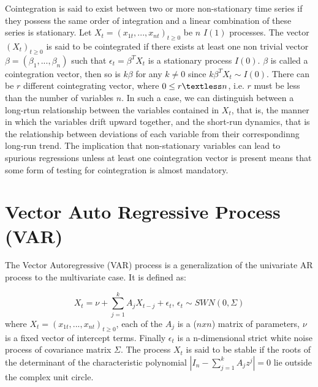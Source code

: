 \documentclass[11pt,a4,twosided,singlespacing,titlepagenumber=on]{scrreprt}
\numberwithin{equation}{chapter} %
\theoremstyle{remark}
\begin{document}
Cointegration is said to exist between two or more non-stationary time series if they possess the same order of integration and a linear combination of these series is stationary. Let $X_t = (x_{1t},...,x_{nt})_{t \geq 0}$ be $n$ $I(1)$ processes. The vector $(X_t)_{t \geq 0}$ is said to be cointegrated if there exists at least one non trivial vector $\beta = (\beta_1,...,\beta_n)$ such that $\epsilon_t = \beta^T X_t$ is a stationary process $I(0)$. $\beta$ is called a cointegration vector, then so is $k \beta$ for any $k \neq 0$ since $k\beta^TX_t \sim I(0)$. There can be $r$ different cointegrating vector, where $0 \leq r \textless n$, i.e. $r$ must be less than the number of variables $n$. In such a case, we can distinguish between a long-rtun relationship between the variables contained in $X_t$, that is, the manner in which the variables drift upward together, and the short-run dynamics, that is the relationship between deviations of each variable from their correspondinng long-run trend. The implication that non-stationary variables can lead to spurious regressions unless at least one cointegration vector is present means that some form of testing for cointegration is almost mandatory.\\

\section{Vector Auto Regressive Process (VAR)}
The Vector Autoregressive (VAR) process is a generalization of the univariate AR process to the multivariate case. It is defined as:

$$X_t = \nu + \sum_{j=1}^k A_j X_{t-j} + \epsilon_t \text{, } \epsilon_t \sim SWN(0, \Sigma)$$
where $X_t = (x_{1t},...,x_{nt})_{t \geq 0}$, each of the $A_j$ is a ($nxn$) matrix of parameters, $\nu$ is a fixed vector of intercept terms. Finally $\epsilon_t$ is a n-dimensional strict white noise process of covariance matrix $\Sigma$. The process $X_t$ is said to be stable if the roots of the determinant of the characteristic polynomial $|I_n - \sum_{j=1}^k A_j z^j| = 0$ lie outside the complex unit circle.
\end{document}
